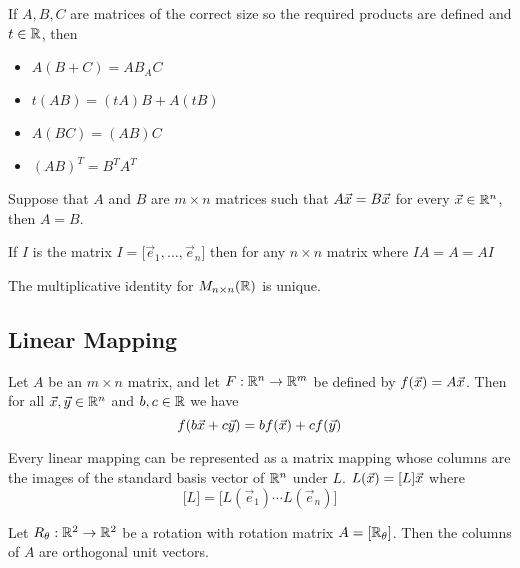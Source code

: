 \documentclass[english,12pt]{article}
\begin{document}
\begin{thrm}
If $A,B,C$ are matrices of the correct size so the required products are defined and $t \in {\mathbb{R}}$, then
\begin{itemize}
\item $A(B+C) = AB _ AC$
\item $t (AB) = (tA)B + A(tB)$
\item $A(BC) = (AB)C$
\item $(AB)^T = B^T A^T$
\end{itemize}
\end{thrm}

\begin{thrm}
Suppose that $A$ and $B$ are $m \times n$ matrices such that $A\vec{x} = B\vec{x}$ for every $\vec{x} \in {\mathbb{R}}^n$, then $A=B$.
\end{thrm}

\begin{thrm}
If $I$ is the matrix $I = \lbrack \vec{e}_1,\dots,\vec{e}_n \rbrack$ then for any $n \times n$ matrix where $IA = A = AI$
\end{thrm}

\begin{thrm}
The multiplicative identity for $M_{n\times n} ({\mathbb{R}})$ is unique.
\end{thrm}

\subsection{Linear Mapping}

\begin{thrm}
Let $A$ be an $m \times n$ matrix, and let $F: {\mathbb{R}}^n \rightarrow {\mathbb{R}}^m$ be defined by $f(\vec{x}) = A\vec{x}$. Then for all $\vec{x},\vec{y} \in {\mathbb{R}}^n$ and $b,c \in {\mathbb{R}}$ we have
\[f(b\vec{x} + c\vec{y}) = bf(\vec{x}) + cf(\vec{y})\]
\end{thrm}

\begin{thrm}
Every linear mapping can be represented as a matrix mapping whose columns are the images of the standard basis vector of ${\mathbb{R}}^n$ under $L$. $L(\vec{x}) = \lbrack L \rbrack \vec{x}$ where
\[\lbrack L \rbrack = \lbrack L(\vec{e}_{1}) \cdots L(\vec{e}_{n}) \rbrack\]
\end{thrm}

\begin{thrm}
Let $R_{\theta}: {\mathbb{R}}^2 \rightarrow {\mathbb{R}}^2$ be a rotation with rotation matrix $A = \lbrack {\mathbb{R}}_{\theta} \rbrack$. Then the columns of $A$ are orthogonal unit vectors.
\end{thrm}
\end{document}
